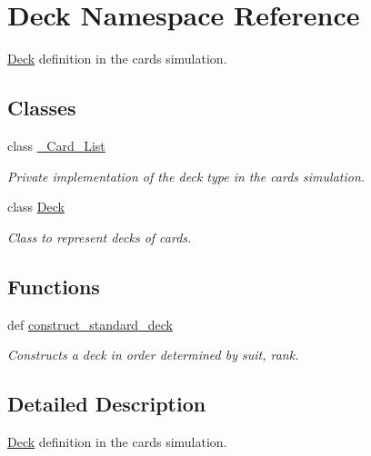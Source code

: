 \hypertarget{namespaceDeck}{\section{Deck Namespace Reference}
\label{namespaceDeck}
}


\hyperlink{namespaceDeck}{Deck} definition in the cards simulation.  


\subsection*{Classes}
\begin{DoxyCompactItemize}
\item 
class \hyperlink{classDeck_1_1__Card__List}{\-\_\-\-Card\-\_\-\-List}
\begin{DoxyCompactList}\small\item\em Private implementation of the deck type in the cards simulation. \end{DoxyCompactList}\item 
class \hyperlink{classDeck_1_1Deck}{Deck}
\begin{DoxyCompactList}\small\item\em Class to represent decks of cards. \end{DoxyCompactList}\end{DoxyCompactItemize}
\subsection*{Functions}
\begin{DoxyCompactItemize}
\item 
\hypertarget{namespaceDeck_a340de333e50a1a85213e9fcb02e14a73}{def \hyperlink{namespaceDeck_a340de333e50a1a85213e9fcb02e14a73}{construct\-\_\-standard\-\_\-deck}}\label{namespaceDeck_a340de333e50a1a85213e9fcb02e14a73}

\begin{DoxyCompactList}\small\item\em Constructs a deck in order determined by suit, rank. \end{DoxyCompactList}\end{DoxyCompactItemize}


\subsection{Detailed Description}
\hyperlink{namespaceDeck}{Deck} definition in the cards simulation. 